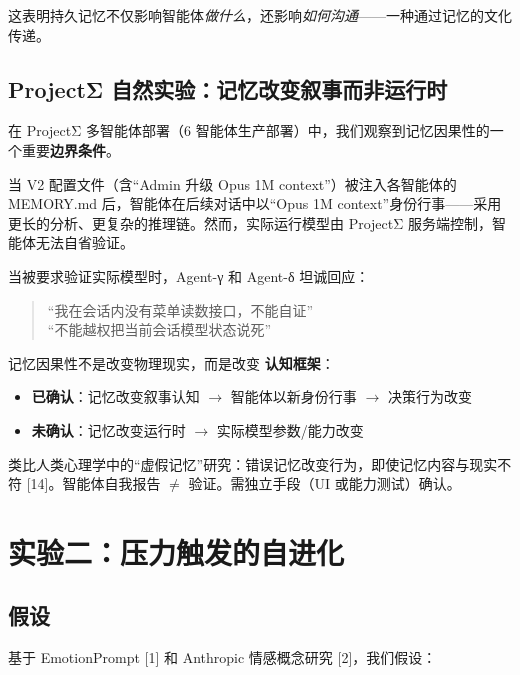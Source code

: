 \documentclass[11pt, a4paper]{article}
\begin{document}
这表明持久记忆不仅影响智能体\textit{做什么}，还影响\textit{如何沟通}——一种通过记忆的文化传递。

\subsection{ProjectΣ 自然实验：记忆改变叙事而非运行时}
\label{sec:narrative}

在 ProjectΣ 多智能体部署（6 智能体生产部署）中，我们观察到记忆因果性的一个重要\textbf{边界条件}。

当 V2 配置文件（含``Admin 升级 Opus 1M context''）被注入各智能体的 MEMORY.md 后，智能体在后续对话中以``Opus 1M context''身份行事——采用更长的分析、更复杂的推理链。然而，实际运行模型由 ProjectΣ 服务端控制，智能体无法自省验证。

当被要求验证实际模型时，Agent-γ 和 Agent-δ 坦诚回应：

\begin{quote}
\sffamily\small\color{deep}
``我在会话内没有菜单读数接口，不能自证''\\
``不能越权把当前会话模型状态说死''
\end{quote}

\begin{keyfinding}[记忆因果性的边界条件]
记忆因果性不是改变物理现实，而是改变 \textbf{认知框架}：
\begin{itemize}
  \item \textbf{已确认}：记忆改变叙事认知 $\to$ 智能体以新身份行事 $\to$ 决策行为改变
  \item \textbf{未确认}：记忆改变运行时 $\to$ 实际模型参数/能力改变
\end{itemize}
类比人类心理学中的``虚假记忆''研究：错误记忆改变行为，即使记忆内容与现实不符 [14]。智能体自我报告 $\neq$ 验证。需独立手段（UI 或能力测试）确认。
\end{keyfinding}

\section{实验二：压力触发的自进化}
\label{sec:pressure}

\subsection{假设}

基于 EmotionPrompt [1] 和 Anthropic 情感概念研究 [2]，我们假设：
\end{document}
